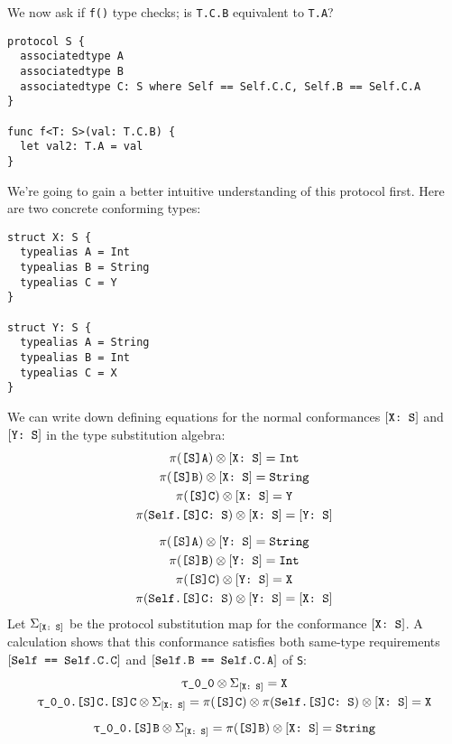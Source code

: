 \documentclass[../generics]{subfiles}
\begin{document}
\begin{example}\label{proto assoc rule}
We now ask if \texttt{f()} type checks; is \texttt{T.C.B} equivalent to \texttt{T.A}?
\begin{Verbatim}
protocol S {
  associatedtype A
  associatedtype B
  associatedtype C: S where Self == Self.C.C, Self.B == Self.C.A
}

func f<T: S>(val: T.C.B) {
  let val2: T.A = val
}
\end{Verbatim}
We're going to gain a better intuitive understanding of this protocol first. Here are two concrete conforming types:
\begin{Verbatim}
struct X: S {
  typealias A = Int
  typealias B = String
  typealias C = Y
}

struct Y: S {
  typealias A = String
  typealias B = Int
  typealias C = X
}
\end{Verbatim}
We can write down defining equations for the normal conformances $[\texttt{X:~S}]$ and $[\texttt{Y:~S}]$ in the type substitution algebra:
\begin{gather*}
\pi(\texttt{[S]A}) \otimes [\texttt{X:~S}] = \texttt{Int}\\
\pi(\texttt{[S]B}) \otimes [\texttt{X:~S}] = \texttt{String}\\
\pi(\texttt{[S]C}) \otimes [\texttt{X:~S}] = \texttt{Y}\\
\pi(\texttt{Self.[S]C:~S}) \otimes [\texttt{X:~S}] = [\texttt{Y:~S}]\\[\medskipamount]
\pi(\texttt{[S]A}) \otimes [\texttt{Y:~S}] = \texttt{String}\\
\pi(\texttt{[S]B}) \otimes [\texttt{Y:~S}] = \texttt{Int}\\
\pi(\texttt{[S]C}) \otimes [\texttt{Y:~S}] = \texttt{X}\\
\pi(\texttt{Self.[S]C:~S}) \otimes [\texttt{Y:~S}] = [\texttt{X:~S}]
\end{gather*}
Let $\Sigma_{[\texttt{X:~S}]}$ be the protocol substitution map for the conformance $[\texttt{X:~S}]$. A calculation shows that this conformance satisfies both same-type requirements $[\texttt{Self == Self.C.C}]$ and $[\texttt{Self.B == Self.C.A}]$ of \texttt{S}:
\begin{gather*}
\ttgp{0}{0}\otimes\Sigma_{\ConfReq{X}{S}}=\texttt{X}\\
\texttt{\ttgp{0}{0}.[S]C.[S]C}\otimes\Sigma_{\ConfReq{X}{S}}=\AssocType{[S]C}\otimes\AssocConf{Self.[S]C}{S}\otimes\ConfReq{X}{S}=\texttt{X}\\[\medskipamount]
\texttt{\ttgp{0}{0}.[S]B}\otimes\Sigma_{\ConfReq{X}{S}}=\AssocType{[S]B}\otimes\ConfReq{X}{S}=\texttt{String}\\

\end{gather*}
\end{example}
\end{document}
